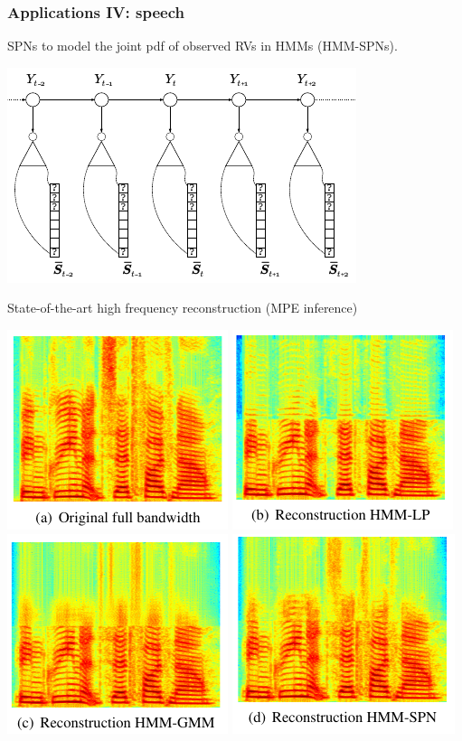 \documentclass[10pt, t, xcolor={usenames,dvipsnames,svgnames}, compress]{beamer}
\begin{document}
\begin{frame}
  \frametitle{Applications IV: speech}
  SPNs to model the joint pdf of observed RVs in HMMs (HMM-SPNs).
  \begin{center}
    \includegraphics[width=0.35\columnwidth]{figures/peharz2014a-figures/hmm-spn-model}
  \end{center}\par\bigskip

  State-of-the-art high frequency reconstruction (MPE inference)
  \begin{center}
    \includegraphics[width=0.25\columnwidth]{figures/peharz2014a-figures/orig}
    \includegraphics[width=0.25\columnwidth]{figures/peharz2014a-figures/hmm-lp}
    \includegraphics[width=0.25\columnwidth]{figures/peharz2014a-figures/hmm-gmm}
    \includegraphics[width=0.25\columnwidth]{figures/peharz2014a-figures/hmm-spn}
  \end{center}
  
\end{frame}
\end{document}
